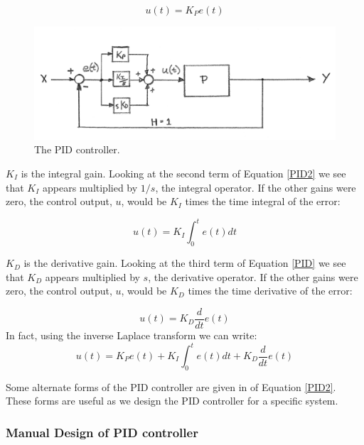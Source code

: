\[
u(t) = K_P e(t)
\]



\begin{figure}\centering
\includegraphics[width=5.0in]{figs11/00651a.png}
\caption{The PID controller.}\label{PIDBlockDiagram}
\end{figure}


{\bf $K_I$} is the integral gain.
Looking at the second term of Equation \ref{PID2} we see that $K_I$ appears multiplied by $1/s$, the integral operator.  If the other gains were zero, the control output, $u$, would be $K_I$ times the time integral of the error:	%

\[
u(t) = K_I \int_0^t e(t) dt
\]






{\bf $K_D$} is the derivative gain.
Looking at the third term of Equation \ref{PID} we see that $K_D$ appears multiplied by $s$, the derivative operator.  If the other gains were zero, the control output, $u$, would be $K_D$ times the time derivative of the error:	%

\[
u(t) = K_D \frac{d}{dt}e(t)
\]
In fact, using the inverse Laplace transform we can write:
\[
u(t) = K_P e(t)  + K_I \int_0^t e(t) dt + K_D \frac{d}{dt}e(t)
\]


Some alternate forms of the PID controller are given in of Equation \ref{PID2}.  These forms are useful as we design the PID controller for a specific system.



\subsubsection{Manual Design of PID controller}\label{manualPIDdesign}

